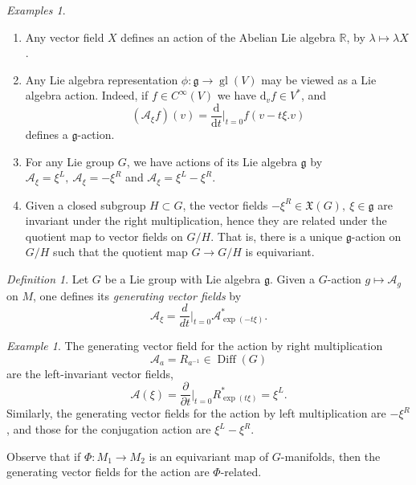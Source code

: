 \documentclass{article}
\theoremstyle{remark}
\newtheorem{definition}[theorem]{Definition}
\newtheorem{example}[theorem]{Example}
\newtheorem{examples}[theorem]{Examples}
\newcommand\A{\mathcal{A}}
\newcommand{\R}{\mathbb{R}}
\newcommand\lie[1]{\mathfrak{#1}}
\newcommand{\g}{\lie{g}}
\newcommand{\on}{\operatorname}
\renewcommand{\d}{{\mbox{d}}}
\newcommand{\f}{\frac}
\newcommand{\p}{\partial}
\newcommand{\mf}{\mathfrak}
\begin{document}
\begin{examples}
\begin{enumerate}
\item 
Any vector field $X$ defines an action of the Abelian Lie algebra $\R$, by $\lambda\mapsto \lambda X$. 
\item 
Any Lie algebra representation $\phi\colon \g\to \on{gl}(V)$ may be viewed as a
Lie algebra action. Indeed, if $f\in C^\infty(V)$ we have $\d_vf\in V^*$, and 
\[ (\A_\xi f)(v)=\f{\d}{\d t}|_{t=0} f(v-t\xi.v)\]
defines a $\g$-action.
\item 
For any Lie group $G$, we have actions of its Lie algebra $\g$ by $\A_\xi=\xi^L,\ \A_\xi=-\xi^R$ and 
$\A_\xi=\xi^L-\xi^R$.
\item 
Given a closed subgroup $H\subset G$, the vector fields $-\xi^R\in\mf{X}(G),\ \xi\in\g$ are 
invariant under the right multiplication, hence they are related under the quotient map 
to vector fields on $G/H$. That is, there is a unique $\g$-action on $G/H$ such that 
the quotient map $G\to G/H$ is equivariant.  
\end{enumerate} 
\end{examples}

\begin{definition}
Let $G$ be a Lie group with Lie algebra $\g$. 
Given a $G$-action $g\mapsto \A_g$ on $M$, one defines its \emph{generating vector fields} by 
%
$$ \A_\xi=\f{d}{d t}\Big|_{t=0} \A_{\exp(-t\xi)}^*.$$
%
\end{definition}

\begin{example}
The generating vector field for the action by right multiplication 
\[ \A_a=R_{a^{-1}}\in \on{Diff}(G)\]
are the left-invariant vector fields,
%
\[ \A(\xi)=\f{\p}{\p t}|_{t=0} R_{\exp(t\xi)}^* =\xi^L.\]
% 
Similarly, the generating vector fields for the action by left multiplication are $-\xi^R$, and those for the conjugation action are $\xi^L-\xi^R$. 
\end{example}

Observe that if $\Phi\colon M_1\to M_2$ is an equivariant map of $G$-manifolds, then the 
generating vector fields for the action are $\Phi$-related.
\end{document}
